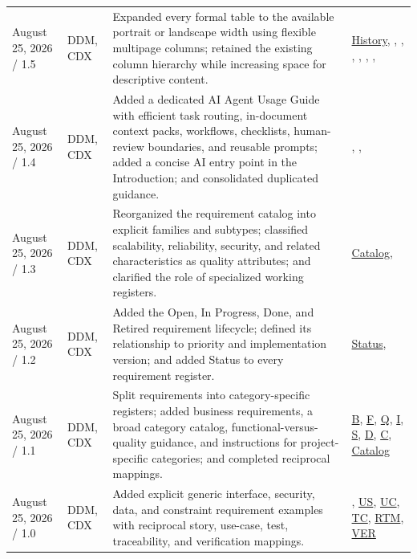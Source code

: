\begin{tabularx}{\linewidth}{L{3.1cm}L{2.2cm}YL{2.0cm}}
August 25, 2026 / 1.5 & DDM, CDX & Expanded every formal table to the available portrait or landscape width using flexible multipage columns; retained the existing column hierarchy while increasing space for descriptive content. & \hyperref[Table:DocumentHistory]{History}, , , , , , , \\
August 25, 2026 / 1.4 & DDM, CDX & Added a dedicated AI Agent Usage Guide with efficient task routing, in-document context packs, workflows, checklists, human-review boundaries, and reusable prompts; added a concise AI entry point in the Introduction; and consolidated duplicated guidance. & , , \\
August 25, 2026 / 1.3 & DDM, CDX & Reorganized the requirement catalog into explicit families and subtypes; classified scalability, reliability, security, and related characteristics as quality attributes; and clarified the role of specialized working registers. & \hyperref[Table:RequirementCategoryCatalog]{Catalog}, \\
August 25, 2026 / 1.2 & DDM, CDX & Added the Open, In Progress, Done, and Retired requirement lifecycle; defined its relationship to priority and implementation version; and added Status to every requirement register. & \hyperref[Table:RequirementStatusDefinitions]{Status}, \\
August 25, 2026 / 1.1 & DDM, CDX & Split requirements into category-specific registers; added business requirements, a broad category catalog, functional-versus-quality guidance, and instructions for project-specific categories; and completed reciprocal mappings. & \hyperref[Table:BusinessRequirements]{B}, \hyperref[Table:FunctionalRequirements]{F}, \hyperref[Table:QualityRequirements]{Q}, \hyperref[Table:InterfaceRequirements]{I}, \hyperref[Table:SecurityRequirements]{S}, \hyperref[Table:DataRequirements]{D}, \hyperref[Table:ConstraintRequirements]{C}, \hyperref[Table:RequirementCategoryCatalog]{Catalog}\\
August 25, 2026 / 1.0 & DDM, CDX & Added explicit generic interface, security, data, and constraint requirement examples with reciprocal story, use-case, test, traceability, and verification mappings. & , \hyperref[Table:UserStories]{US}, \hyperref[Chapter:UseCases]{UC}, \hyperref[Chapter:Tests]{TC}, \hyperref[Table:TraceabilityMatrix]{RTM}, \hyperref[Table:VerificationRegister]{VER}\\

\end{tabularx}
